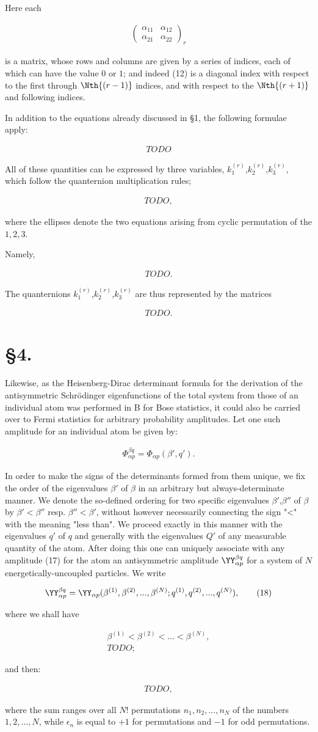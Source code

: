 \documentclass{article}
\newcommand{\nequ}[2]{
\begin{align*}
#1
\tag{#2}
\end{align*}
}
\begin{document}
Here each
\nequ{
\left(
\begin{matrix}
  \alpha_{11} & \alpha_{12} \\
  \alpha_{21} & \alpha_{22}
\end{matrix}
\right)_r
}{12}
is a matrix, whose rows and columns are given by a series of indices, each of which can have the value $0$ or $1$; and indeed (12)
is a diagonal index with respect to the first through $\Nth{(r-1)}$ indices, and with respect to the $\Nth{(r+1)}$ and following indices.

In addition to the equations already discussed in §1, the following formulae apply:
\nequ{TODO}{13}

All of these quantities can be expressed by three variables, $k^{(r)}_1$,$k^{(r)}_2$,$k^{(r)}_3$, which follow the quanternion multiplication rules;
\nequ{TODO,}{14}
where the ellipses denote the two equations arising from cyclic permutation of the $1,2,3$.

Namely,
\nequ{TODO.}{15}

The quanternions $k^{(r)}_1$,$k^{(r)}_2$,$k^{(r)}_3$ are thus represented by the matrices
\nequ{TODO.}{16}

\section*{§4.}
Likewise, as the Heisenberg-Dirac determinant formula for the derivation of the antisymmetric Schrödinger eigenfunctions of the total system from those of an individual atom was performed in B for Bose statistics, it could also be carried over to Fermi statistics for arbitrary probability amplitudes. Let one such amplitude for an individual atom be given by:
\nequ{
\Phi^{\beta q}_{\alpha p} = \Phi_{\alpha p}(\beta',q').}{17}

In order to make the signs of the determinants formed from them unique, we fix the order of the eigenvalues $\beta'$ of $\beta$ in an arbitrary but always-determinate manner. We denote the so-defined ordering for two specific eigenvalues $\beta'$,$\beta''$ of $\beta$ by $\beta' < \beta''$ resp. $\beta'' < \beta'$, without however necessarily connecting the sign "<" with the meaning "less than". We proceed exactly in this manner with the eigenvalues $q'$ of $q$ and generally with the eigenvalues $Q'$ of any measurable quantity of the atom. After doing this one can uniquely associate with any amplitude (17) for the atom an antisymmetric amplitude $\YY^{\beta q}_{\alpha p}$ for a system of $N$ energetically-uncoupled particles. We write
\nequ{
\YY^{\beta q}_{\alpha p} = \YY_{\alpha p}(\beta^{(1)}, \beta^{(2)},...,\beta^{(N)};
q^{(1)}, q^{(2)},...,q^{(N)}),
}{18}
where we shall have
\nequ{
\beta^{(1)} < \beta^{(2)} < ... < \beta^{(N)},\\
TODO;
}{19}
and then:
\nequ{TODO,}{20}
where the sum ranges over all $N!$ permutations $n_1,n_2,...,n_N$ of the numbers $1,2,...,N$, while $\epsilon_n$ is equal to $+1$ for  permutations and $-1$ for odd permutations. 
\end{document}
